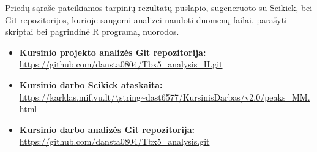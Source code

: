 \documentclass[12pt]{article}
\begin{document}
Priedų sąraše pateikiamos tarpinių rezultatų puslapio, sugeneruoto su Scikick,
bei Git repozitorijos, kurioje saugomi analizei naudoti duomenų failai,
parašyti skriptai bei pagrindinė R programa, nuorodos.

\begin{itemize}
    \item \textbf{Kursinio projekto analizės Git repozitorija:}\\
        \url{https://github.com/dansta0804/Tbx5\_analysis\_II.git}
    \item \textbf{Kursinio darbo Scikick ataskaita:}\\
        \url{https://karklas.mif.vu.lt/\string~dast6577/KursinisDarbas/v2.0/peaks\_MM.html}
    \item \textbf{Kursinio darbo analizės Git repozitorija:}\\
        \url{https://github.com/dansta0804/Tbx5\_analysis.git}
  \end{itemize}
\end{document}
